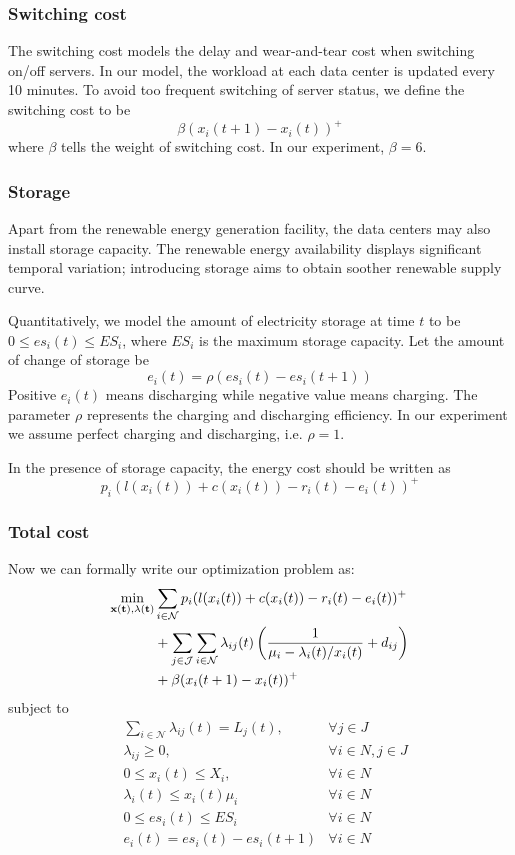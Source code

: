 \documentclass{acm_proc_article-sp}
\begin{document}
\subsubsection{Switching cost}
The switching cost models the delay and wear-and-tear cost when switching on/off servers. In our model, the workload at each data center is updated every 10 minutes. To avoid too frequent switching of server status, we define the switching cost to be
$$\beta(x_i(t+1) - x_i(t))^+$$
where $\beta$ tells the weight of switching cost. In our experiment, $\beta = 6$.

\subsubsection{Storage}
Apart from the renewable energy generation facility, the data centers may also install storage capacity. The renewable energy availability displays significant temporal variation; introducing storage aims to obtain soother renewable supply curve.

Quantitatively, we model the amount of electricity storage at time $t$ to be $0 \leq es_i(t) \leq ES_i$, where $ES_i$ is the maximum storage capacity. Let the amount of change of storage be
$$e_i(t) = \rho (es_i(t) - es_i(t+1))$$
Positive $e_i(t)$ means discharging while negative value means charging. The parameter $\rho$ represents the charging and discharging efficiency. In our experiment we assume perfect charging and discharging, i.e. $\rho = 1$.

In the presence of storage capacity, the energy cost should be written as
\begin{equation}
p_i(l(x_i(t)) + c(x_i(t)) - r_i(t) - e_i(t))^+
\end{equation}

\subsubsection{Total cost}
Now we can formally write our optimization problem as:
\begin{align*}
\min_{\bf{x}(t), \bf{\lambda}(t)} & \sum_{i \in \mathcal{N}} p_i(l(x_i(t)) + c(x_i(t)) - r_i(t) - e_i(t))^+ \\
& + \sum_{j \in \mathcal{J}}\sum_{i \in \mathcal{N}}
\lambda_{ij}(t)\left(\frac{1}{\mu_i - \lambda_i(t)/x_i(t)} + d_{ij}\right) \\
& + \beta(x_i(t+1) - x_i(t))^+
\end{align*}
subject to
\begin{align*}
& \sum_{i\in \mathcal{N}}\lambda_{ij}(t) = L_j(t), &\forall j\in J \\
& \lambda_{ij} \geq 0, & \forall i\in N, j\in J \\
& 0 \leq x_i(t) \leq X_i, & \forall i \in N \\
& \lambda_i(t) \leq x_i(t)\mu_i & \forall i \in N \\
& 0 \leq es_i(t) \leq ES_i & \forall i \in N \\
& e_i(t) = es_i(t) - es_i(t+1) & \forall i \in N
\end{align*}
\end{document}
